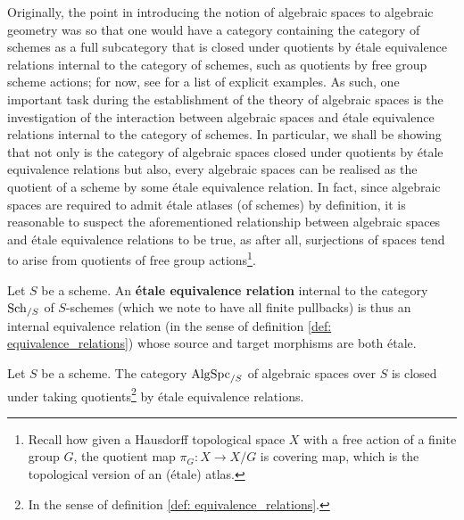             \begin{remark} \label{remark: why_algebraic_spaces}
                Originally, the point in introducing the notion of algebraic spaces to algebraic geometry was so that one would have a category containing the category of schemes as a full subcategory that is closed under quotients by \'etale equivalence relations internal to the category of schemes, such as quotients by free group scheme actions; for now, see \cite[\href{https://stacks.math.columbia.edu/tag/02Z0}{Tag 02Z0}]{stacks} for a list of explicit examples. As such, one important task during the establishment of the theory of algebraic spaces is the investigation of the interaction between algebraic spaces and \'etale equivalence relations internal to the category of schemes. In particular, we shall be showing that not only is the category of algebraic spaces closed under quotients by \'etale equivalence relations but also, every algebraic spaces can be realised as the quotient of a scheme by some \'etale equivalence relation. In fact, since algebraic spaces are required to admit \'etale atlases (of schemes) by definition, it is reasonable to suspect the aforementioned relationship between algebraic spaces and \'etale equivalence relations to be true, as after all, surjections of spaces tend to arise from quotients of free group actions\footnote{Recall how given a Hausdorff topological space $X$ with a free action of a finite group $G$, the quotient map $\pi_G: X \to X/G$ is covering map, which is the topological version of an (\'etale) atlas.}. 
            \end{remark}
            \begin{definition} \label{def: etale_equivalence_relations}
                Let $S$ be a scheme. An \textbf{\'etale equivalence relation} internal to the category $\mathrm{Sch}_{/S}$ of $S$-schemes (which we note to have all finite pullbacks) is thus an internal equivalence relation (in the sense of definition \ref{def: equivalence_relations}) whose source and target morphisms are both \'etale.
            \end{definition}
            \begin{proposition} \label{prop: quotients_of_algebraic_spaces_by_etale_equivalence_relations_are_algebraic_spaces}
                Let $S$ be a scheme. The category $\mathrm{Alg}\mathrm{Spc}_{/S}$ of algebraic spaces over $S$ is closed under taking quotients\footnote{In the sense of definition \ref{def: equivalence_relations}.} by \'etale equivalence relations.
            \end{proposition}
